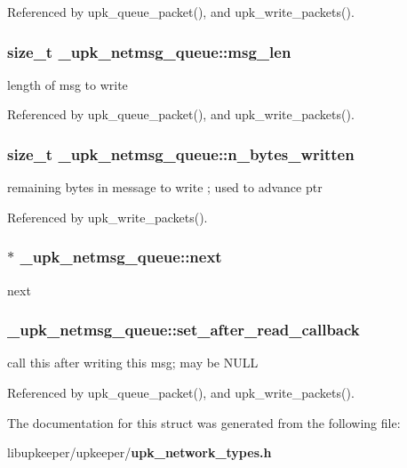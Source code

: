 Referenced by upk\_\-queue\_\-packet(), and upk\_\-write\_\-packets().

\subsubsection[{msg\_\-len}]{\setlength{\rightskip}{0pt plus 5cm}size\_\-t {\bf \_\-upk\_\-netmsg\_\-queue::msg\_\-len}}\label{struct__upk__netmsg__queue_a72d42bbdbfdd3281240ba032a478072c}
length of msg to write 

Referenced by upk\_\-queue\_\-packet(), and upk\_\-write\_\-packets().

\subsubsection[{n\_\-bytes\_\-written}]{\setlength{\rightskip}{0pt plus 5cm}size\_\-t {\bf \_\-upk\_\-netmsg\_\-queue::n\_\-bytes\_\-written}}\label{struct__upk__netmsg__queue_afd55858a2d41feebd6a484c238df816b}
remaining bytes in message to write ; used to advance ptr 

Referenced by upk\_\-write\_\-packets().

\subsubsection[{next}]{$\ast$ {\bf \_\-upk\_\-netmsg\_\-queue::next}}\label{struct__upk__netmsg__queue_ae0bb5e138276f675aaca18d00b3c1c28}
next 
\subsubsection[{set\_\-after\_\-read\_\-callback}]{ {\bf \_\-upk\_\-netmsg\_\-queue::set\_\-after\_\-read\_\-callback}}\label{struct__upk__netmsg__queue_aae926cbdf44d8e4dbd7db28b44f6df34}
call this after writing this msg; may be NULL 

Referenced by upk\_\-queue\_\-packet(), and upk\_\-write\_\-packets().



The documentation for this struct was generated from the following file:\begin{DoxyCompactItemize}
\item 
libupkeeper/upkeeper/{\bf upk\_\-network\_\-types.h}\end{DoxyCompactItemize}
